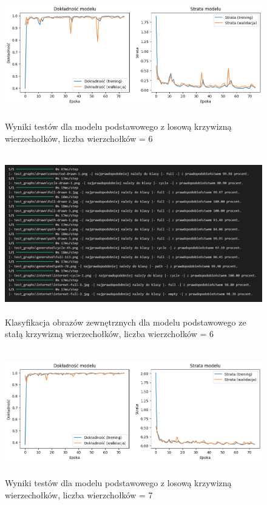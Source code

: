 \begin{figure}[ht]
	\centering
	\includegraphics[height=5.5cm]{resources/tests/images/v3/base6_img.png}
	\caption{Wyniki testów dla modelu podstawowego z losową krzywizną wierzechołków, liczba wierzchołków = 6}
	\label{Fig:tests-base-5}
\end{figure}
\FloatBarrier

\begin{figure}[ht]
	\centering
	\includegraphics[height=7cm]{resources/tests/images/v3/base6_txt.png}
	\caption{Klasyfikacja obrazów zewnętrznych dla modelu podstawowego ze stałą krzywizną wierzechołków, liczba wierzchołków = 6}
	\label{Fig:tests-base-6}
\end{figure}
\FloatBarrier

\begin{figure}[ht]
	\centering
	\includegraphics[height=5.5cm]{resources/tests/images/v3/base7_img.png}
	\caption{Wyniki testów dla modelu podstawowego z losową krzywizną wierzechołków, liczba wierzchołków = 7}
	\label{Fig:tests-base-7}
\end{figure}
\FloatBarrier

